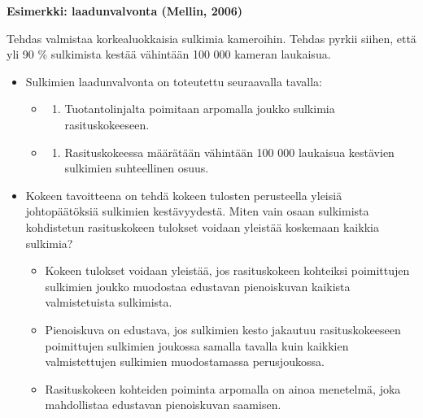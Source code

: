 \documentclass[
]{book}
\providecommand{\tightlist}{%
  \setlength{\itemsep}{0pt}\setlength{\parskip}{0pt}}
\begin{document}
\begin{eblock}{}

\textbf{Esimerkki: laadunvalvonta (Mellin, 2006)}

Tehdas valmistaa korkealuokkaisia sulkimia kameroihin. Tehdas pyrkii siihen, että yli 90 \% sulkimista kestää vähintään 100 000 kameran laukaisua.

\begin{itemize}
\tightlist
\item
  Sulkimien laadunvalvonta on toteutettu seuraavalla tavalla:

  \begin{itemize}
  \item
    \begin{enumerate}
    \def\labelenumi{(\roman{enumi})}
    \tightlist
    \item
      Tuotantolinjalta poimitaan arpomalla joukko sulkimia rasituskokeeseen.\\
    \end{enumerate}
  \item
    \begin{enumerate}
    \def\labelenumi{(\roman{enumi})}
    \setcounter{enumi}{1}
    \tightlist
    \item
      Rasituskokeessa määrätään vähintään 100 000 laukaisua kestävien sulkimien suhteellinen osuus.\\
    \end{enumerate}
  \end{itemize}
\item
  Kokeen tavoitteena on tehdä kokeen tulosten perusteella yleisiä johtopäätöksiä sulkimien kestävyydestä. Miten vain osaan sulkimista kohdistetun rasituskokeen tulokset voidaan yleistää koskemaan kaikkia sulkimia?

  \begin{itemize}
  \tightlist
  \item
    Kokeen tulokset voidaan yleistää, jos rasituskokeen kohteiksi poimittujen sulkimien joukko muodostaa edustavan pienoiskuvan kaikista valmistetuista sulkimista.\\
  \item
    Pienoiskuva on edustava, jos sulkimien kesto jakautuu rasituskokeeseen poimittujen sulkimien joukossa samalla tavalla kuin kaikkien valmistettujen sulkimien muodostamassa perusjoukossa.\\
  \item
    Rasituskokeen kohteiden poiminta arpomalla on ainoa menetelmä, joka mahdollistaa edustavan pienoiskuvan saamisen.


\end{itemize}
\end{itemize}
\end{eblock}
\end{document}
